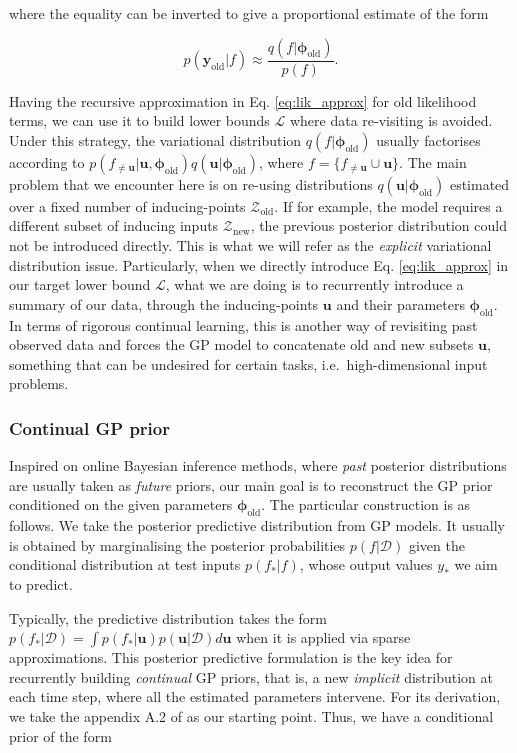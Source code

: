 \documentclass[]{article}
\def\u{{\mathbf u}}
\newcommand{\Zcal}{\mathcal{Z}}
\newcommand{\Dcal}{\mathcal{D}}
\newcommand{\Lcal}{\mathcal{L}}
\newcommand{\yc}{\bm{y}}
\newcommand{\ycold}{{\yc_{\text{old}}}}
\newcommand{\phiold}{{\bm{\phi}_{\text{old}}}}
\begin{document}
where the equality can be inverted to give a proportional estimate of the form

\begin{equation}
\label{eq:lik_approx}
	p(\ycold|f) \approx \frac{q(f|\phiold)}{p(f)}.
\end{equation}

Having the recursive approximation in Eq. \eqref{eq:lik_approx} for old likelihood terms, we can use it to build lower bounds $\Lcal$ where data re-visiting is avoided. Under this strategy, the variational distribution $q(f|\phiold)$ usually factorises according to $p(f_{\neq \u}| \u, \phiold)q(\u|\phiold)$, where $f = \{f_{\neq \u} \cup \u\}$. The main problem that we encounter here is on re-using distributions $q(\u|\phiold)$ estimated over a fixed number of inducing-points $\Zcal_\text{old}$. If for example, the model requires a different subset of inducing inputs $\Zcal_\text{new}$, the previous posterior distribution could not be introduced directly. This is what we will refer as the \textit{explicit} variational distribution issue. Particularly, when we directly introduce Eq. \eqref{eq:lik_approx} in our target lower bound $\Lcal$, what we are doing is to recurrently introduce a summary of our data, through the inducing-points $\u$ and their parameters $\phiold$. In terms of rigorous continual learning, this is another way of revisiting past observed data and forces the GP model to concatenate old and new subsets $\u$, something that can be undesired for certain tasks, i.e.\ high-dimensional input problems.

\subsubsection*{Continual GP prior}

Inspired on online Bayesian inference methods, where \textit{past} posterior distributions are usually taken as \textit{future} priors, our main goal is to reconstruct the GP prior conditioned on the given parameters $\phiold$. The particular construction is as follows. We take the posterior predictive distribution from GP models. It usually is obtained by marginalising the posterior probabilities $p(f|\Dcal)$ given the conditional distribution at test inputs $p(f_*|f)$, whose output values $y_{*}$ we aim to predict. 

Typically,  the predictive distribution takes the form $p(f_*|\Dcal) = \int p(f_*|\u)p(\u|\Dcal)d\u$ when it is applied via sparse approximations.  This posterior predictive formulation is the key idea for recurrently building \textit{continual} GP priors, that is, a new \textit{implicit} distribution at each time step, where all the estimated parameters intervene. For its derivation, we take the appendix A.2 of \citet{alvarez2009variational} as our starting point. Thus, we have a conditional prior of the form
\end{document}
